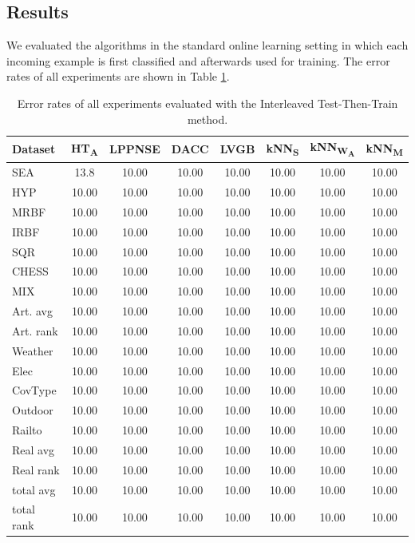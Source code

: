 \documentclass[conference]{IEEEtran}
\begin{document}
\subsection{Results}
We evaluated the algorithms in the standard online learning setting in which each incoming example is first classified and afterwards used for training. The error rates of all experiments are shown
in Table \ref{tab:result}.\\
\begin{table}
\caption{Error rates of all experiments evaluated with the Interleaved Test-Then-Train method.}
\label{tab:result}
\centering
\begin{tabular}{l|ccccccc}
Dataset & HT\textsubscript{A} & LPPNSE &DACC& LVGB & kNN\textsubscript{S} & kNN\textsubscript{W\textsubscript{A}}& kNN\textsubscript{M}\\\hline
SEA & 13.8 & 10.00 & 10.00 & 10.00 & 10.00 & 10.00 & 10.00\\
HYP & 10.00 & 10.00 & 10.00 & 10.00 & 10.00 & 10.00 & 10.00\\ 
MRBF & 10.00 & 10.00 & 10.00 & 10.00 & 10.00 & 10.00 & 10.00\\
IRBF & 10.00 & 10.00 & 10.00 & 10.00 & 10.00 & 10.00 & 10.00\\
SQR & 10.00 & 10.00 & 10.00 & 10.00 & 10.00 & 10.00 & 10.00\\
CHESS & 10.00 & 10.00 & 10.00 & 10.00 & 10.00 & 10.00 & 10.00\\
MIX & 10.00 & 10.00 & 10.00 & 10.00 & 10.00 & 10.00 & 10.00\\\hline
Art. avg & 10.00 & 10.00 & 10.00 & 10.00 & 10.00 & 10.00 & 10.00\\\hline
Art. rank & 10.00 & 10.00 & 10.00 & 10.00 & 10.00 & 10.00 & 10.00\\\hline
Weather & 10.00 & 10.00 & 10.00 & 10.00 & 10.00 & 10.00 & 10.00\\
Elec & 10.00 & 10.00 & 10.00 & 10.00 & 10.00 & 10.00 & 10.00\\
CovType & 10.00 & 10.00 & 10.00 & 10.00 & 10.00 & 10.00 & 10.00\\
Outdoor & 10.00 & 10.00 & 10.00 & 10.00 & 10.00 & 10.00 & 10.00\\
Railto & 10.00 & 10.00 & 10.00 & 10.00 & 10.00 & 10.00 & 10.00\\\hline
Real avg& 10.00 & 10.00 & 10.00 & 10.00 & 10.00 & 10.00 & 10.00\\\hline
Real rank& 10.00 & 10.00 & 10.00 & 10.00 & 10.00 & 10.00 & 10.00\\\hline
total avg& 10.00 & 10.00 & 10.00 & 10.00 & 10.00 & 10.00 & 10.00\\\hline
total rank& 10.00 & 10.00 & 10.00 & 10.00 & 10.00 & 10.00 & 10.00\\\hline
\end{tabular}
\end{table}
\end{document}
